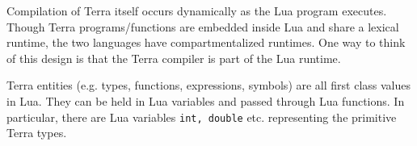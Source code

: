 \item Compilation of Terra itself occurs dynamically as the Lua program executes. Though Terra programs/functions are embedded inside Lua and share a lexical runtime, the two languages have compartmentalized runtimes. One way to think of this design is that the Terra compiler
is part of the Lua runtime.

\item Terra entities (e.g. types, functions, expressions, symbols) are all first class values in Lua.
They can be held in Lua variables and passed through Lua functions. In particular, there are Lua variables {\tt int, double} etc. representing the primitive Terra types.

\ee

  \ee
